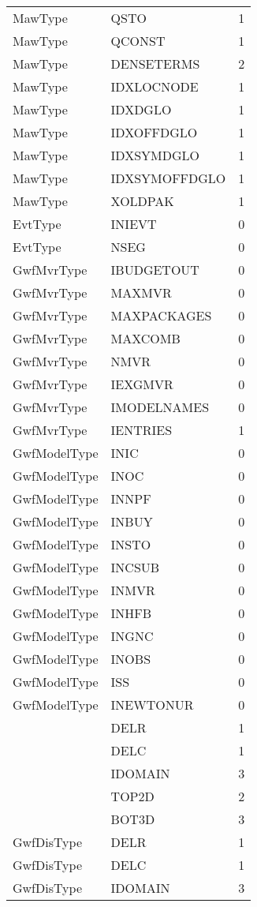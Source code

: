 \begin{longtable}{p{6cm} p{4cm} p{2cm} }
MawType &  QSTO & 1 \\ 
MawType &  QCONST & 1 \\ 
MawType &  DENSETERMS & 2 \\ 
MawType &  IDXLOCNODE & 1 \\ 
MawType &  IDXDGLO & 1 \\ 
MawType &  IDXOFFDGLO & 1 \\ 
MawType &  IDXSYMDGLO & 1 \\ 
MawType &  IDXSYMOFFDGLO & 1 \\ 
MawType &  XOLDPAK & 1 \\ 
EvtType &  INIEVT & 0 \\ 
EvtType &  NSEG & 0 \\ 
GwfMvrType &  IBUDGETOUT & 0 \\ 
GwfMvrType &  MAXMVR & 0 \\ 
GwfMvrType &  MAXPACKAGES & 0 \\ 
GwfMvrType &  MAXCOMB & 0 \\ 
GwfMvrType &  NMVR & 0 \\ 
GwfMvrType &  IEXGMVR & 0 \\ 
GwfMvrType &  IMODELNAMES & 0 \\ 
GwfMvrType &  IENTRIES & 1 \\ 
GwfModelType &   INIC & 0 \\ 
GwfModelType &   INOC & 0 \\ 
GwfModelType &  INNPF & 0 \\ 
GwfModelType &  INBUY & 0 \\ 
GwfModelType &  INSTO & 0 \\ 
GwfModelType &  INCSUB & 0 \\ 
GwfModelType &  INMVR & 0 \\ 
GwfModelType &  INHFB & 0 \\ 
GwfModelType &  INGNC & 0 \\ 
GwfModelType &  INOBS & 0 \\ 
GwfModelType &    ISS & 0 \\ 
GwfModelType &  INEWTONUR & 0 \\ 
 &  DELR & 1 \\ 
 &  DELC & 1 \\ 
 & IDOMAIN & 3 \\ 
 &  TOP2D & 2 \\ 
 & BOT3D & 3 \\ 
GwfDisType &  DELR & 1 \\ 
GwfDisType &  DELC & 1 \\ 
GwfDisType &  IDOMAIN & 3 \\ 

\end{longtable}
